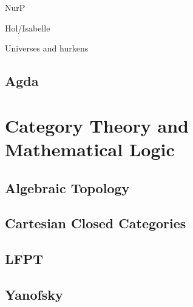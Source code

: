 NurP

Hol/Isabelle

Universes and hurkens


\subsection{Agda}
\section{Category Theory and Mathematical Logic}
\subsection{Algebraic Topology}
\subsection{Cartesian Closed Categories}
\subsection{LFPT}
\subsection{Yanofsky}

